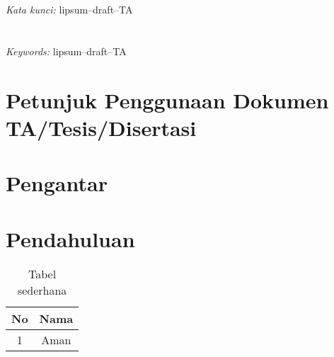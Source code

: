 \documentclass{book}
\begin{document}
        \textit{Kata kunci:} lipsum--draft--TA

        \chapter*{\abstractname}
        \lipsum[1]

        \textit{Keywords:} lipsum--draft--TA


    \chapter*{Petunjuk Penggunaan Dokumen TA/Tesis/Disertasi}
    \lipsum[1]

    \chapter*{Pengantar} %
    \label{Preface}      %
    \lipsum

    \chapter{Pendahuluan} %
    \label{Intro}        %
    \lipsum[1]

    \begin{table}[h!]
        \centering
        \caption{Tabel sederhana}
        \begin{tabular}{|c|c|}
            \hline
            No & Nama \\\hline\hline
            1  & Aman \\\hline
        \end{tabular}
        \label{tab:nama}
    \end{table}
\end{document}
